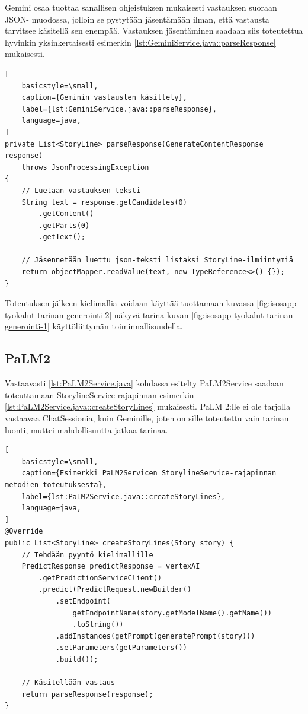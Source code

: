 Gemini osaa tuottaa sanallisen ohjeistuksen mukaisesti vastauksen suoraan JSON-
muodossa, jolloin se pystytään jäsentämään ilman, että vastausta tarvitsee
käsitellä sen enempää. Vastauksen jäsentäminen saadaan siis toteutettua
hyvinkin yksinkertaisesti esimerkin \ref{lst:GeminiService.java::parseResponse}
mukaisesti.

\begin{lstlisting}[
    basicstyle=\small,
    caption={Geminin vastausten käsittely},
    label={lst:GeminiService.java::parseResponse},
    language=java,
]
private List<StoryLine> parseResponse(GenerateContentResponse response)
    throws JsonProcessingException
{
    // Luetaan vastauksen teksti
    String text = response.getCandidates(0)
        .getContent()
        .getParts(0)
        .getText();

    // Jäsennetään luettu json-teksti listaksi StoryLine-ilmiintymiä
    return objectMapper.readValue(text, new TypeReference<>() {});
}
\end{lstlisting}

Toteutuksen jälkeen kielimallia voidaan käyttää tuottamaan kuvassa
\ref{fig:isosapp-tyokalut-tarinan-generointi-2} näkyvä tarina kuvan
\ref{fig:isosapp-tyokalut-tarinan-generointi-1} käyttöliittymän
toiminnallisuudella.

\subsection{PaLM2}

Vastaavasti \ref{lst:PaLM2Service.java} kohdassa esitelty PaLM2Service saadaan
toteuttamaan StorylineService-rajapinnan esimerkin
\ref{lst:PaLM2Service.java::createStoryLines} mukaisesti. PaLM 2:lle ei ole
tarjolla vastaavaa ChatSessionia, kuin Geminille, joten on sille toteutettu
vain tarinan luonti, muttei mahdollisuutta jatkaa tarinaa.

\begin{lstlisting}[
    basicstyle=\small,
    caption={Esimerkki PaLM2Servicen StorylineService-rajapinnan metodien toteutuksesta},
    label={lst:PaLM2Service.java::createStoryLines},
    language=java,
]
@Override
public List<StoryLine> createStoryLines(Story story) {
    // Tehdään pyyntö kielimallille
    PredictResponse predictResponse = vertexAI
        .getPredictionServiceClient()
        .predict(PredictRequest.newBuilder()
            .setEndpoint(
                getEndpointName(story.getModelName().getName())
                .toString())
            .addInstances(getPrompt(generatePrompt(story)))
            .setParameters(getParameters())
            .build());

    // Käsitellään vastaus
    return parseResponse(response);
}
\end{lstlisting}

